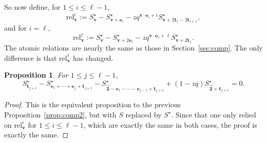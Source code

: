 \documentclass[pdftex]{sigma}
\numberwithin{equation}{section}
\newtheorem{Proposition}[Theorem]{Proposition}
\theoremstyle{definition}
\newcommand{\rel}{\text{rel}}
\newcommand{\tr}{\mathbf{t}}
\newcommand{\vv}{\mathbf{v}}
\newcommand{\ee}{\mathbf{e}}
\newcommand{\two}{\vec{\mathbf{2}}}
\begin{document}
So now define, for $1\le i \le \ell-1$,
\begin{equation*}
\rel^i_\vv:=S^\star_\vv - S^\star_{\vv+\ee_i} - zq^{\vv\cdot\ee_i+i} S^\star_{\vv+2\tr_1-2\tr_{i+1}},
\end{equation*}
and for $i=\ell$,
\begin{equation*}
\rel^\ell_\vv:=S^\star_\vv - S^\star_{\vv+2\ee_\ell} - zq^{\vv\cdot\ee_\ell+\ell} S^\star_{\vv+2\tr_1}.
\end{equation*}
The atomic relations are nearly the same as those in Section~\ref{sec:comp}. The only difference is that $\rel^\ell_\vv$ has changed.

\begin{Proposition} \label{prop:comp2_AB}
For $1 \le j \le \ell-1$,
\begin{equation*}
S^\star_{\tr_{j+1}} -S^\star_{\ee_1+\cdots+\ee_{j}+\tr_{j+1}}- S^\star_{\two-\ee_1-\cdots-\ee_{j-1}+\tr_{j+1}} + (1-zq)S^\star_{\two+\tr_{j+1}}=0.
\end{equation*}
\end{Proposition}
\begin{proof}
This is the equivalent proposition to the previous Proposition~\ref{prop:comp2}, but with $S$ replaced by $S^\star$. Since that one only relied on $\rel^i_\vv$ for $1\le i \le \ell-1$, which are exactly the same in both cases, the proof is exactly the same.
\end{proof}
\end{document}
